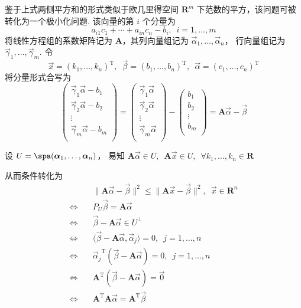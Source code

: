 鉴于上式两侧平方和的形式类似于欧几里得空间 $ \mathbf{R}^{m} $ 下范数的平方，该问题可被转化为一个极小化问题.
该向量的第 $ i $ 个分量为
\[a_{i1}c_1 + \cdots  + a_{in}c_n - b_i, \enspace i = 1, \ldots , m\]
将线性方程组的系数矩阵记为 $ \mathbf{A} $，其列向量组记为 $ \vec{\alpha} _1 , \ldots , \vec{\alpha} _n $，
行向量组记为 $ \vec{\gamma} _1 , \ldots , \vec{\gamma} _m $. 令
\[ \vec{x} = (k_1, \ldots , k_n)^{\mathrm{T}}, \enspace \vec{\beta} = (b_1, \ldots , b_n)^{\mathrm{T}}, \enspace
\vec{\alpha} = (c_1, \ldots , c_n)^{\mathrm{T}}\]
将分量形式合写为
\[
\begin{pmatrix}
    \vec{\gamma} _1\vec{\alpha} - b_1 \\
    \vec{\gamma} _2\vec{\alpha} - b_2 \\
    \vdots  \\
    \vec{\gamma} _m\vec{\alpha} - b_m \\
\end{pmatrix}
    =
    \begin{pmatrix}
    \vec{\gamma} _1\vec{\alpha} \\
    \vec{\gamma} _2\vec{\alpha} \\
    \vdots  \\
    \vec{\gamma} _m\vec{\alpha} \\
\end{pmatrix}
-
\begin{pmatrix}
    b_1 \\
    b_2 \\
    \vdots  \\
    b_m \\
\end{pmatrix}
= \mathbf{A}\vec{\alpha} - \vec{\beta}
\]

设 $ U = \spa(\vec{\alpha} _1 , \ldots , \vec{\alpha} _n)$，
易知 $ \mathbf{A}\vec{\alpha} \in U , \enspace \mathbf{A}\vec{x} \in U , \enspace \forall k_1, \ldots , k_n \in \mathbf{R}$

从而条件转化为
\begin{align*}
    & \lVert \mathbf{A}\vec{\alpha} - \vec{\beta} \rVert^{2} \leqslant \lVert \mathbf{A}\vec{x} - \vec{\beta} \rVert^{2},
    \enspace \vec{x} \in \mathbf{R}^{n} \\
    \iff \quad & P_U \vec{\beta} = \mathbf{A}\vec{\alpha} \\
    \iff \quad & \vec{\beta} - \mathbf{A}\vec{\alpha} \in U^{\perp} \\
    \iff \quad & \langle \vec{\beta} - \mathbf{A}\vec{\alpha}, \vec{\alpha} _j \rangle = 0, \enspace j = 1, \ldots , n \\
    \iff \quad & {\vec{\alpha} _j}^{\mathrm{T}}(\vec{\beta} - \mathbf{A}\vec{\alpha}) = 0, \enspace j = 1, \ldots , n \\
    \iff \quad & \mathbf{A}^{\mathrm{T}}(\vec{\beta} - \mathbf{A}\vec{\alpha}) = \vec{0} \\
    \iff \quad & \mathbf{A}^{\mathrm{T}}\mathbf{A}\vec{\alpha} = \mathbf{A}^{\mathrm{T}}\vec{\beta}
\end{align*}

